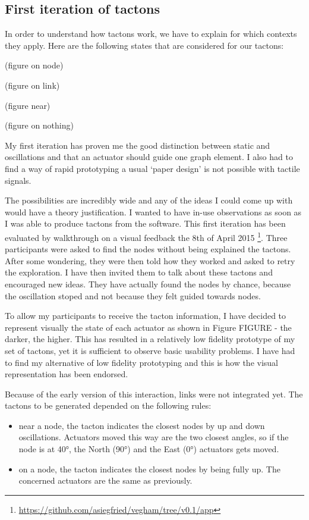 \subsection{First iteration of
tactons}\label{first-iteration-of-tactons}

In order to understand how tactons work, we have to explain for which
contexts they apply. Here are the following states that are considered
for our tactons:

(figure on node)

(figure on link)

(figure near)

(figure on nothing)

My first iteration has proven me the good distinction between static and
oscillations and that an actuator should guide one graph element. I also
had to find a way of rapid prototyping a usual `paper design' is not
possible with tactile signals.

The possibilities are incredibly wide and any of the ideas I could come up with would have a theory justification. I wanted to have in-use observations as soon as I was able to produce tactons from the software. This first iteration has been evaluated by walkthrough on a visual feedback the 8th of
April 2015 \footnote{\url{https://github.com/asiegfried/vegham/tree/v0.1/app}}. Three participants were asked to find the nodes without being explained the tactons. After some wondering, they were then told how they worked and asked to retry the exploration. I have then invited them to talk about these tactons and encouraged new ideas. They have actually found the nodes by chance, because the oscillation stoped and not because they felt guided towards nodes.

To allow my participants to receive the tacton information, I have decided to represent visually the state of each actuator as shown in Figure FIGURE - the
darker, the higher. This has resulted in a relatively low fidelity
prototype of my set of tactons, yet it is sufficient to observe basic
usability problems. I have had to find my alternative of low fidelity
prototyping and this is how the visual representation has been endorsed.

Because of the early version of this interaction, links were not
integrated yet. The tactons to be generated depended on the following
rules:

\begin{itemize}
\item
  near a node, the tacton indicates the closest nodes by up and down
  oscillations. Actuators moved this way are the two closest angles, so
  if the node is at 40°, the North (90°) and the East (0°) actuators
  gets moved.
\item
  on a node, the tacton indicates the closest nodes by being fully up.
  The concerned actuators are the same as previously.
\end{itemize}

